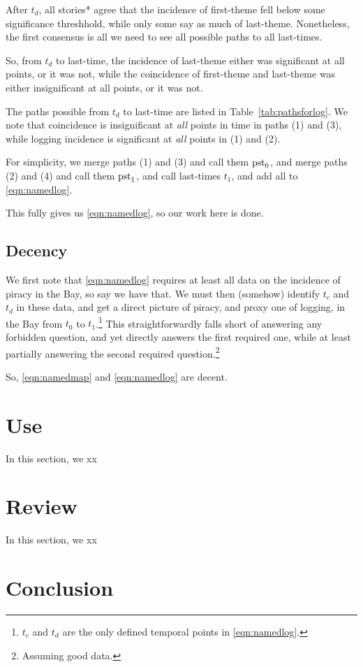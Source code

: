 			After \(t_d\), all stories* agree that the incidence of first-theme fell below some significance threshhold, while only some say as much of last-theme. Nonetheless, the first consensus is all we need to see all possible paths to all last-times.
			
			So, from \(t_d\) to last-time, the incidence of last-theme either was significant at all points, or it was not, while the coincidence of first-theme and last-theme was either insignificant at all points, or it was not.
			
			The paths possible from \(t_d\) to last-time are listed in Table~\ref{tab:pathsforlog}. We note that coincidence is insignificant at \emph{all} points in time in paths (1) and (3), while logging incidence is significant at \emph{all} points in (1) and (2).
			
			For simplicity, we merge paths (1) and (3) and call them \(\operatorname{pst}_0\), and merge paths (2) and (4) and call them \(\operatorname{pst}_1\), and call last-times \(t_1\), and add all to \ref{eqn:namedlog}. 
			
			This fully gives us \ref{eqn:namedlog}, so our work here is done.
	\subsection{Decency}
	\label{ss:decency}
		We first note that \ref{eqn:namedlog} requires at least all data on the incidence of piracy in the Bay, so say we have that. We must then (somehow) identify \(t_c\) and \(t_d\) in these data, and get a direct picture of piracy, and proxy one of logging, in the Bay from \(t_0\) to \(t_1\).\footnote{\(t_c\) and \(t_d\) are the only defined temporal points in \ref{eqn:namedlog}.} This straightforwardly falls short of answering any forbidden question, and yet directly answers the first required one, while at least partially answering the second required question.\footnote{Assuming good data.}
		
		So, \ref{eqn:namedmap} and \ref{eqn:namedlog} are decent.
%
%
%
\section{Use}
\label{s:use}
	In this section, we xx
%
%
%
\section{Review}
\label{s:review}
	In this section, we xx
%
%
%
\section{Conclusion}
\label{s:concl}
%
%
%
